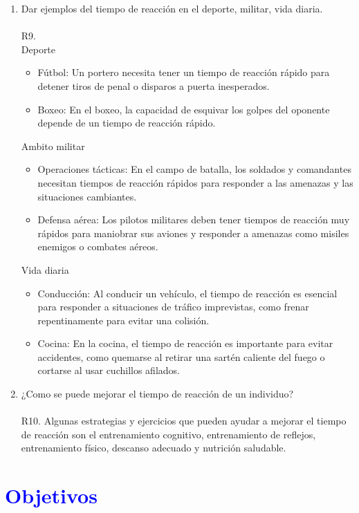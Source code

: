 \documentclass[11pt]{article}
\begin{document}
\begin{multicols}{2}
\begin{enumerate}
            \item Dar ejemplos del tiempo de reacción en el deporte, militar, vida diaria.\\\\
            R9.\\
            Deporte
            \begin{itemize}
                \item Fútbol: Un portero necesita tener un tiempo de reacción rápido para detener tiros de penal o disparos a puerta inesperados.
                \item Boxeo: En el boxeo, la capacidad de esquivar los golpes del oponente depende de un tiempo de reacción rápido.
            \end{itemize}
            Ambito militar
            \begin{itemize}
                \item Operaciones tácticas: En el campo de batalla, los soldados y comandantes necesitan tiempos de reacción rápidos para responder a las amenazas y las situaciones cambiantes.
                \item Defensa aérea: Los pilotos militares deben tener tiempos de reacción muy rápidos para maniobrar sus aviones y responder a amenazas como misiles enemigos o combates aéreos.
            \end{itemize}
            Vida diaria
            \begin{itemize}
                \item Conducción: Al conducir un vehículo, el tiempo de reacción es esencial para responder a situaciones de tráfico imprevistas, como frenar repentinamente para evitar una colisión.
                \item Cocina: En la cocina, el tiempo de reacción es importante para evitar accidentes, como quemarse al retirar una sartén caliente del fuego o cortarse al usar cuchillos afilados.
            \end{itemize}
            \item ¿Como se puede mejorar el tiempo de reacción de
            un individuo?\\\\
            R10. Algunas estrategias y ejercicios que pueden ayudar a mejorar el tiempo de reacción son el entrenamiento cognitivo, entrenamiento de reflejos, entrenamiento físico, descanso adecuado y nutrición saludable.
        \end{enumerate}


        \section{\textbf{\textcolor{blue}{Objetivos}}}


\end{multicols}
\end{document}
